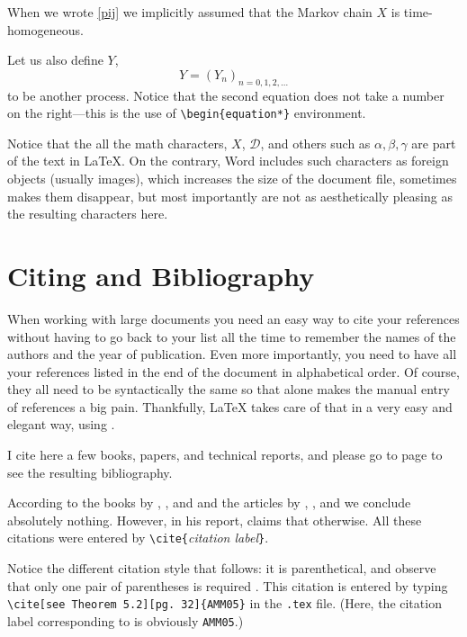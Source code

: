 When we wrote \eqref{pij} we implicitly assumed that the Markov
chain $X$ is time-homogeneous.

Let us also define $Y$,
\begin{equation*}
Y = (Y_n)_{n = 0,1,2,\ldots}
\end{equation*}
to be another process. Notice that the second equation does not take
a number on the right---this is the use of \verb|\begin{equation*}|
environment.

Notice that the all the math characters, $X$, $\mathcal{D}$, and
others such as $\alpha, \beta, \gamma$ are part of the text in
\LaTeX{}. On the contrary, Word includes such characters as foreign
objects (usually images), which increases the size of the document
file, sometimes makes them disappear, but most importantly are not
as aesthetically pleasing as the resulting characters here.

\section{Citing and Bibliography}
When working with large documents you need an easy way to cite your
references without having to go back to your list all the time to
remember the names of the authors and the year of publication. Even
more importantly, you need to have all your references listed in the
end of the document in alphabetical order. Of course, they all need
to be syntactically the same so that alone makes the manual entry of
references a big pain. Thankfully, \LaTeX{} takes care of that in a
very easy and elegant way, using \BibTeX.

I cite here a few books, papers, and technical reports, and please
go to page \pageref{bib} to see the resulting bibliography.

According to the books by \cite{C75}, \cite{BR02}, and \cite{MR97}
and the articles by \cite{DG01}, \cite{BBM05}, and \cite{CFPS04} we
conclude absolutely nothing. However, in his report, \cite{A04}
claims that otherwise. All these citations were entered by \verb|\cite{|\emph{citation label}\verb|}|.
 
Notice the different citation style that follows: it is parenthetical, and observe that only one pair of parentheses is required \cite[see Theorem 5.2][pg. 32]{AMM05}. This citation is entered by typing \verb|\cite[see Theorem 5.2][pg. 32]{AMM05}| in the \verb|.tex| file. (Here, the citation label corresponding to \cite{AMM05} is obviously \verb|AMM05|.)


